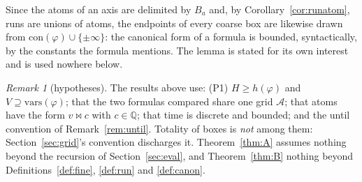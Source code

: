 \documentclass[11pt,a4paper]{article}
\theoremstyle{plain}
\theoremstyle{definition}
\theoremstyle{remark}
\newtheorem{remark}[theorem]{Remark}
\newcommand{\Q}{\mathbb{Q}}
\newcommand{\Ax}{\mathcal{A}}
\begin{document}
Since the atoms of an axis are delimited by $B_a$ and, by
Corollary~\ref{cor:runatom}, runs are unions of atoms, the endpoints of every
coarse box are likewise drawn from $\mathrm{con}(\varphi) \cup \{\pm\infty\}$:
the canonical form of a formula is bounded, syntactically, by the constants the
formula mentions. The lemma is stated for its own interest and is used nowhere
below.

\begin{remark}[hypotheses]
The results above use: \textup{(P1)} $H \ge h(\varphi)$ and $V \supseteq
\mathrm{vars}(\varphi)$; that the two formulas compared share one grid $\Ax$;
that atoms have the form $v \bowtie c$ with $c \in \Q$; that time is discrete and
bounded; and the until convention of Remark~\ref{rem:until}. Totality of boxes is
\emph{not} among them: Section~\ref{sec:grid}'s convention discharges it.
Theorem~\ref{thm:A} assumes nothing beyond the recursion of
Section~\ref{sec:eval}, and Theorem~\ref{thm:B} nothing beyond
Definitions~\ref{def:fine}, \ref{def:run} and \ref{def:canon}.
\end{remark}
\end{document}

